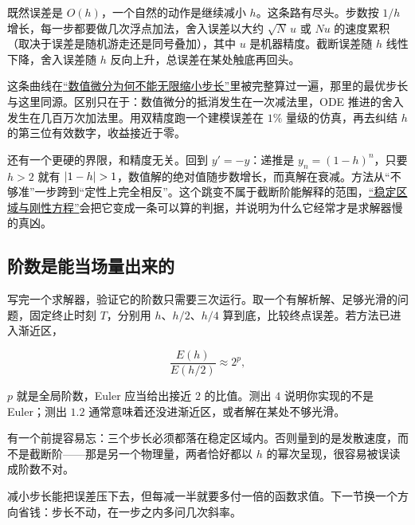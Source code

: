 既然误差是 \(O(h)\)，一个自然的动作是继续减小 \(h\)。这条路有尽头。步数按 \(1/h\) 增长，每一步都要做几次浮点加法，舍入误差以大约 \(\sqrt{N}\,u\) 或 \(N u\) 的速度累积（取决于误差是随机游走还是同号叠加），其中 \(u\) 是机器精度。截断误差随 \(h\) 线性下降，舍入误差随 \(h\) 反向上升，总误差在某处触底再回头。

这条曲线在\hyperref[sec:08-Numerical-Analysis/04-Numerical-Differentiation-and-Integration/01]{``数值微分为何不能无限缩小步长''}里被完整算过一遍，那里的最优步长与这里同源。区别只在于：数值微分的抵消发生在一次减法里，ODE 推进的舍入发生在几百万次加法里。用双精度跑一个建模误差在 \(1\%\) 量级的仿真，再去纠结 \(h\) 的第三位有效数字，收益接近于零。

还有一个更硬的界限，和精度无关。回到 \(y'=-y\)：递推是 \(y_n=(1-h)^n\)，只要 \(h>2\) 就有 \(\abs{1-h}>1\)，数值解的绝对值随步数增长，而真解在衰减。方法从``不够准''一步跨到``定性上完全相反''。这个跳变不属于截断阶能解释的范围，\hyperref[sec:08-Numerical-Analysis/06-ODE/03]{``稳定区域与刚性方程''}会把它变成一条可以算的判据，并说明为什么它经常才是求解器慢的真凶。

\subsection{阶数是能当场量出来的}

写完一个求解器，验证它的阶数只需要三次运行。取一个有解析解、足够光滑的问题，固定终止时刻 \(T\)，分别用 \(h\)、\(h/2\)、\(h/4\) 算到底，比较终点误差。若方法已进入渐近区，

\[
\frac{E(h)}{E(h/2)}\approx 2^{p},
\]

\(p\) 就是全局阶数，Euler 应当给出接近 \(2\) 的比值。测出 \(4\) 说明你实现的不是 Euler；测出 \(1.2\) 通常意味着还没进渐近区，或者解在某处不够光滑。

有一个前提容易忘：三个步长必须都落在稳定区域内。否则量到的是发散速度，而不是截断阶——那是另一个物理量，两者恰好都以 \(h\) 的幂次呈现，很容易被误读成阶数不对。

减小步长能把误差压下去，但每减一半就要多付一倍的函数求值。下一节换一个方向省钱：步长不动，在一步之内多问几次斜率。
